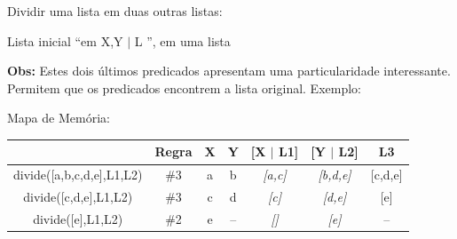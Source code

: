 \documentclass[sans]{beamer}
\begin{document}

\begin{frame}
\begin{block}{Dividir uma lista em duas outras listas:}

Lista inicial ``{em \lbrack  X,Y $\vert $ L \rbrack }'', em uma lista



\textbf{Obs:} Estes dois últimos predicados apresentam
uma particularidade interessante. Permitem que os predicados encontrem a lista
original. Exemplo:


\end{block}

\end{frame}

\begin{frame}
  

{\scriptsize
\begin{block}{Mapa de Memória:}
\begin{center}
\begin{tabular}[c]{c|c|c|c|c|c|c}\hline\hline

  & \textbf{Regra} & \textbf{X} & \textbf{Y} & \textbf{[X $\vert$ L1]} & \textbf{[Y
$\vert$ L2]} & \textbf{L3}\\ \hline \hline 

divide([a,b,c,d,e],L1,L2) & \#3 & a & b &
\emph{[a,c]} & \emph{[b,d,e]} & [c,d,e]\\\hline
divide([c,d,e],L1,L2) & \#3 & c & d & \emph{[c]} & \emph{[d,e]} &
[e]\\\hline 
divide([e],L1,L2) & \#2 & e & -- & \emph{[]} &
\emph{[e]} & --\\ \hline \hline
\end{tabular}
\end{center}
\end{block}
}   
\end{frame}
\end{document}

